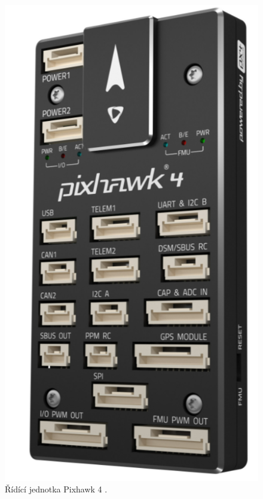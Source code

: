 \begin{figure}[!ht]
    \begin{center}
        \includegraphics[scale=0.47]{obrazky/PIX}
    \end{center}
    \caption[Řídící jednotka Pixhawk 4]{Řídící jednotka Pixhawk 4 \cite{PIX2}.}
    \label{fig:PIX}
\end{figure}

